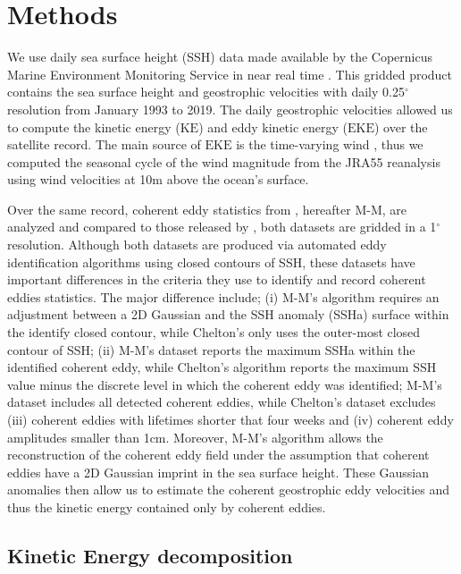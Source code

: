 \documentclass[draft,linenumbers]{agujournal2019}
\newcommand{\KE}{\textrm{KE}}
\newcommand{\EKE}{\textrm{EKE}}
\begin{document}
\section{Methods}
\label{sec:Methods}
	We use daily sea surface height (SSH) data made available by the Copernicus Marine Environment Monitoring Service in near real time \citep{CMEMS_aviso_2017}. 
	This gridded product contains the sea surface height and geostrophic velocities with daily 0.25$^\circ$ resolution from January 1993 to 2019.
	The daily geostrophic velocities allowed us to compute the kinetic energy ($\KE$) and eddy kinetic energy ($\EKE$) over the satellite record. The main source of $\EKE$ is the time-varying wind \citep{Ferrari_energy_2009}, thus we computed the seasonal cycle of the wind magnitude from the JRA55 reanalysis \citep{JMA_JRA55_2013} using wind velocities at 10m above the ocean's surface. 

	Over the same record, coherent eddy statistics from \citet{Martinez_TKE_2019}, hereafter M-M, are analyzed and compared to those released by \citet{Chelton_mesoscale_2013}, both datasets are gridded in a 1$^\circ$ resolution. 
	Although both datasets are produced via automated eddy identification algorithms using closed contours of SSH, these datasets have important differences in the criteria they use to identify and record coherent eddies statistics. 
	The major difference include; (i) M-M's algorithm requires an adjustment between a 2D Gaussian and the SSH anomaly (SSHa) surface within the identify closed contour, while Chelton's only uses the outer-most closed contour of SSH; (ii) M-M's dataset reports the maximum SSHa within the identified coherent eddy, while Chelton's algorithm reports the maximum SSH value minus the discrete level in which the coherent eddy was identified; M-M's dataset includes all detected coherent eddies, while Chelton's dataset excludes (iii) coherent eddies with lifetimes shorter that four weeks and (iv) coherent eddy amplitudes smaller than 1cm. Moreover, M-M's algorithm allows the reconstruction of the coherent eddy field under the assumption that coherent eddies have a 2D Gaussian imprint in the sea surface height. These Gaussian anomalies then allow us to estimate the coherent geostrophic eddy velocities and thus the kinetic energy contained only by coherent eddies.

	\subsection{Kinetic Energy decomposition}
\end{document}
